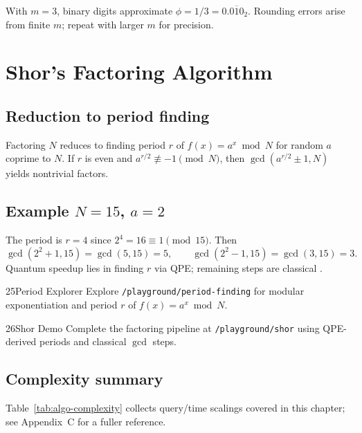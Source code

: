 \begin{example}
With $m=3$, binary digits approximate $\phi=1/3=0.\overline{010}_2$. Rounding errors arise from finite $m$; repeat with larger $m$ for precision.
\end{example}

\section{Shor's Factoring Algorithm}
\label{sec:shor}

\subsection{Reduction to period finding}

Factoring $N$ reduces to finding period $r$ of $f(x)=a^x\bmod N$ for random $a$ coprime to $N$. If $r$ is even and $a^{r/2}\not\equiv -1\pmod N$, then $\gcd(a^{r/2}\pm 1,N)$ yields nontrivial factors.

\subsection{Example $N=15$, $a=2$}

The period is $r=4$ since $2^4=16\equiv 1\pmod{15}$. Then
\[
\gcd(2^2+1,15)=\gcd(5,15)=5,\qquad
\gcd(2^2-1,15)=\gcd(3,15)=3.
\]
Quantum speedup lies in finding $r$ via QPE; remaining steps are classical \cite{shor1994}.

\begin{labbox}{25}{Period Explorer}
Explore \texttt{/playground/period-finding} for modular exponentiation and period $r$ of $f(x)=a^x\bmod N$.
\end{labbox}

\begin{labbox}{26}{Shor Demo}
Complete the factoring pipeline at \texttt{/playground/shor} using QPE-derived periods and classical $\gcd$ steps.
\end{labbox}

\subsection{Complexity summary}

Table~\ref{tab:algo-complexity} collects query/time scalings covered in this chapter; see Appendix~C for a fuller reference.


